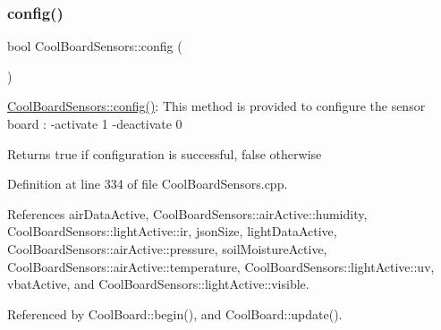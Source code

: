 \mbox{\label{classCoolBoardSensors_a9a218895c5423375c33c08f2c56fb23a}} 
\subsubsection{\texorpdfstring{config()}{config()}}
{\footnotesize\ttfamily bool Cool\+Board\+Sensors\+::config (\begin{DoxyParamCaption}{ }\end{DoxyParamCaption})}

\hyperlink{classCoolBoardSensors_a9a218895c5423375c33c08f2c56fb23a}{Cool\+Board\+Sensors\+::config()}\+: This method is provided to configure the sensor board \+: -\/activate 1 -\/deactivate 0

\begin{DoxyReturn}{Returns}
true if configuration is successful, false otherwise 
\end{DoxyReturn}


Definition at line 334 of file Cool\+Board\+Sensors.\+cpp.



References air\+Data\+Active, Cool\+Board\+Sensors\+::air\+Active\+::humidity, Cool\+Board\+Sensors\+::light\+Active\+::ir, json\+Size, light\+Data\+Active, Cool\+Board\+Sensors\+::air\+Active\+::pressure, soil\+Moisture\+Active, Cool\+Board\+Sensors\+::air\+Active\+::temperature, Cool\+Board\+Sensors\+::light\+Active\+::uv, vbat\+Active, and Cool\+Board\+Sensors\+::light\+Active\+::visible.



Referenced by Cool\+Board\+::begin(), and Cool\+Board\+::update().


